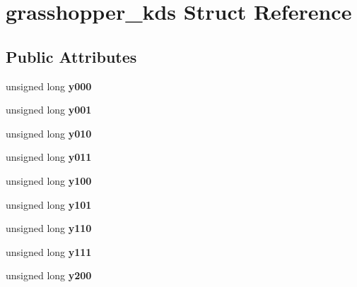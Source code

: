 \hypertarget{structgrasshopper__kds}{}\section{grasshopper\+\_\+kds Struct Reference}
\label{structgrasshopper__kds}
\subsection*{Public Attributes}
\begin{DoxyCompactItemize}
\item 
\mbox{\label{structgrasshopper__kds_ad03b87dfab84c18535274364ab665f63}} 
unsigned long {\bfseries y000}
\item 
\mbox{\label{structgrasshopper__kds_a5d771685bb3238855c9e14cba4884f68}} 
unsigned long {\bfseries y001}
\item 
\mbox{\label{structgrasshopper__kds_ae6077e8dc10d59d58576a8da5c6f6412}} 
unsigned long {\bfseries y010}
\item 
\mbox{\label{structgrasshopper__kds_aad456a3193375ff7316964a46f1da419}} 
unsigned long {\bfseries y011}
\item 
\mbox{\label{structgrasshopper__kds_a96a37469e88a7e7d514abc8236de1cb0}} 
unsigned long {\bfseries y100}
\item 
\mbox{\label{structgrasshopper__kds_a72b80625e7945dd843a1ffbb3ec0460d}} 
unsigned long {\bfseries y101}
\item 
\mbox{\label{structgrasshopper__kds_acf75b2ec7ecd8b47982965c4df4df3a7}} 
unsigned long {\bfseries y110}
\item 
\mbox{\label{structgrasshopper__kds_a7c87ead8c338a63f18a9f64e71e71842}} 
unsigned long {\bfseries y111}
\item 
\mbox{\label{structgrasshopper__kds_aab7d9ea6eb13fd2cd6f75edb37cd8984}} 
unsigned long {\bfseries y200}
\item 

\end{DoxyCompactItemize}
